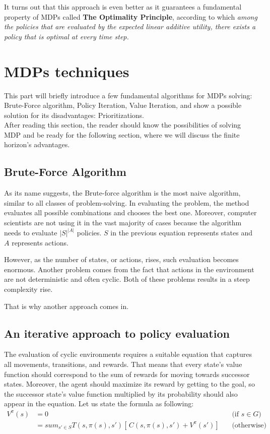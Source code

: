 It turns out that this approach is even better as it guarantees a fundamental property of MDPs called \textbf{The Optimality Principle}, according to which \textit{among the policies that are evaluated by the expected linear additive utility, there exists a policy that is optimal at every time step.}

\section{MDPs techniques}

This part will briefly introduce a few fundamental algorithms for MDPs solving: Brute-Force algorithm, Policy Iteration, Value Iteration, and show a possible solution for its disadvantages: Prioritizations. \\
After reading this section, the reader should know the possibilities of solving MDP and be ready for the following section, where we will discuss the finite horizon's advantages.

\subsection{Brute-Force Algorithm}
As its name suggests, the Brute-force algorithm is the most naive algorithm, similar to all classes of problem-solving. In evaluating the problem, the method evaluates all possible combinations and chooses the best one.
Moreover, computer scientists are not using it in the vast majority of cases because the algorithm needs to evaluate $|S|^{|A|}$ policies.
$S$ in the previous equation represents states and $A$ represents actions.

However, as the number of states, or actions, rises, such evaluation becomes enormous. Another problem comes from the fact that actions in the environment are not deterministic and often cyclic. Both of these problems results in a steep complexity rise.

That is why another approach comes in.

\subsection{An iterative approach to policy evaluation}

The evaluation of cyclic environments requires a suitable equation that captures all movements, transitions, and rewards.
That means that every state's value function should correspond to the sum of rewards for moving towards successor states. Moreover, the agent should maximize its reward by getting to the goal, so the successor state's value function multiplied by its probability should also appear in the equation. Let us state the formula as following:\\
\begin{equation}
\begin{aligned}
V^{\pi} (s) & = 0 && \text{(if $s \in G$)} \\
& = sum_{s' \in S} T(s, \pi (s), s') [ \,C(s, \pi(s), s') + V^{\pi} (s')] \, && \text{(otherwise)}
\end{aligned}
\end{equation}

